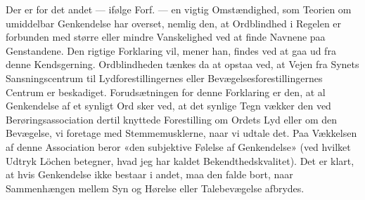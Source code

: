 \documentclass[12pt,a4paper,openany]{book}
\begin{document}
Der er for det andet --- ifølge Forf. --- en vigtig Omstændighed, som Teorien
om umiddelbar Genkendelse har overset, nemlig den, at Ordblindhed i Regelen er
forbunden med større eller mindre Vanskelighed ved at finde Navnene paa
Genstandene. Den rigtige Forklaring vil, mener han, findes ved at gaa ud fra
denne Kendsgerning. Ordblindheden tænkes da at opstaa ved, at Vejen fra Synets
Sansningscentrum til Lydforestillingernes eller Bevægelsesforestillingernes
Centrum er beskadiget. Forudsætningen for denne Forklaring er den, at al
Genkendelse af et synligt Ord sker ved, at det synlige Tegn vækker den ved
Berøringsassociation dertil knyttede Forestilling om Ordets Lyd eller om den
Bevægelse, vi foretage med Stemmemusklerne, naar vi udtale det. Paa Vækkelsen
af denne Association beror «den subjektive Følelse af Genkendelse» (ved hvilket
Udtryk Löchen betegner, hvad jeg har kaldet Bekendthedskvalitet). Det er klart,
at hvis Genkendelse ikke bestaar i andet, maa den falde bort, naar Sammenhængen
mellem Syn og Hørelse eller Talebevægelse afbrydes.
\end{document}

